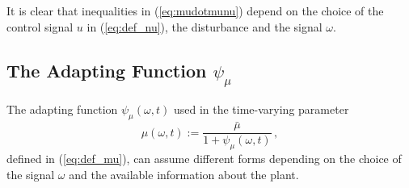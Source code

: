 \documentclass[letterpaper, 10 pt, conference]{ieeeconf}  %
\theoremstyle{plain}
\theoremstyle{definition}
\theoremstyle{remark}
\begin{document}
It is clear that inequalities in (\ref{eq:mudotmunu}) depend on the choice of the control signal $u$ in (\ref{eq:def_nu}), the disturbance and the signal $\omega$. 

\subsection{The Adapting Function $\psi_\mu$}

The adapting function $\psi_\mu(\omega,t)$ used in the time-varying parameter 
%
\begin{equation}
\mu(\omega,t):=\frac{\bar{\mu}}{1+
\psi_\mu(\omega,t)}\,,%
\end{equation}
%
defined in (\ref{eq:def_mu}), can assume different forms depending on the choice of the signal $\omega$ and the available information about the plant. 
\end{document}
